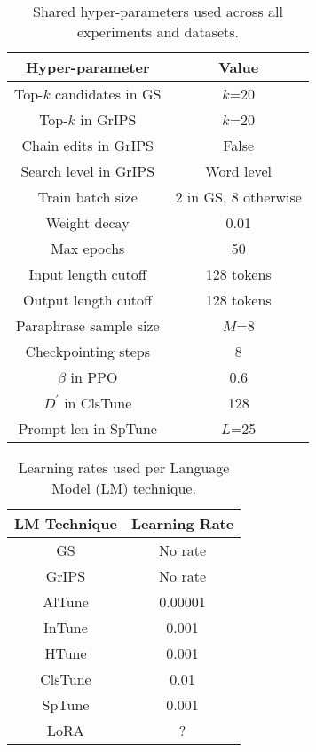 \documentclass[11pt]{article}
\begin{document}
\begin{table}[t]
\centering
\caption{Shared hyper-parameters used across all experiments and datasets.}
\begin{tabular}{ c | c }
\hline
Hyper-parameter & Value\\
\hline
Top-$k$ candidates in GS & $k$=20 \\
Top-$k$ in GrIPS & $k$=20 \\
Chain edits in GrIPS & False \\
Search level in GrIPS & Word level \\
Train batch size & 2 in GS, 8 otherwise \\
Weight decay & 0.01 \\
Max epochs & 50 \\
Input length cutoff & 128 tokens \\
Output length cutoff & 128 tokens \\
Paraphrase sample size & $M$=8 \\
Checkpointing steps & 8 \\
$\beta$ in PPO & 0.6 \\
$D^{'}$ in ClsTune & 128 \\
Prompt len in SpTune & $L$=25
\end{tabular}
\label{hyper-parameters}
\end{table}

\begin{table}[t]
\centering
\caption{Learning rates used per Language Model (LM) technique.}
\begin{tabular}{ c | c }
\hline
LM Technique & Learning Rate\\
\hline
GS & No rate \\
GrIPS & No rate \\
AlTune & 0.00001 \\
InTune &  0.001 \\
HTune & 0.001 \\
ClsTune & 0.01 \\
SpTune & 0.001 \\
LoRA & ?
\end{tabular}
\label{learning-rates}
\end{table}
\end{document}
